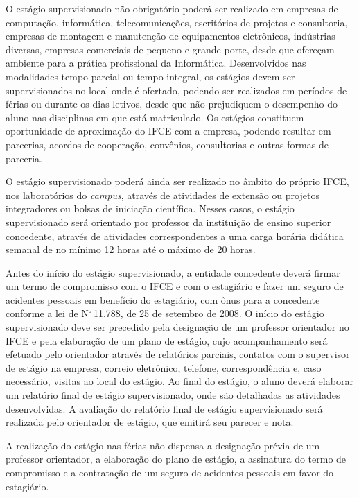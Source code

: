 \documentclass[
	12pt,				%
	openright,			%
	twoside,			%
	a4paper,			%
	chapter=TITLE,		%
	english,			%
	french,				%
	spanish,			%
	brazil,				%
	]{abntex2}
\begin{document}
O estágio supervisionado não obrigatório poderá ser realizado em empresas de computação, informática, telecomunicações, escritórios de projetos e consultoria, empresas de montagem e manutenção de equipamentos eletrônicos, indústrias diversas, empresas comerciais de pequeno e grande porte, desde que ofereçam ambiente para a prática profissional da Informática.  Desenvolvidos nas modalidades tempo parcial ou tempo integral, os estágios devem ser supervisionados no local onde é ofertado, podendo ser realizados em períodos de férias ou durante os dias letivos, desde que não prejudiquem o desempenho do aluno nas disciplinas em que está matriculado.
Os estágios constituem oportunidade de aproximação do IFCE com a empresa, podendo resultar em parcerias, acordos de cooperação, convênios, consultorias e outras formas de parceria.


O estágio supervisionado poderá ainda ser realizado no âmbito do próprio IFCE, nos laboratórios do \textit{campus}, através de atividades de extensão ou projetos integradores ou bolsas de iniciação científica. Nesses casos, o estágio supervisionado será orientado por professor da instituição de ensino superior concedente, através de atividades correspondentes a uma carga horária didática semanal de no mínimo 12 horas até o máximo de 20 horas.

Antes do início do estágio supervisionado, a entidade concedente deverá firmar um termo de compromisso com o IFCE e com o estagiário e fazer um seguro de acidentes pessoais em benefício do estagiário, com ônus para a concedente conforme a lei de N$^\circ$\,11.788, de 25 de setembro de 2008. O início do estágio supervisionado deve ser precedido pela designação de um professor orientador no IFCE e pela elaboração de um plano de estágio, cujo acompanhamento será efetuado pelo orientador através de relatórios parciais, contatos com o supervisor de estágio na empresa, correio eletrônico, telefone, correspondência e, caso necessário, visitas ao local do estágio. Ao final do estágio, o aluno deverá elaborar um relatório final de estágio supervisionado, onde são detalhadas as atividades desenvolvidas. A avaliação do relatório final de estágio supervisionado será realizada pelo orientador de estágio, que emitirá seu parecer e nota. 

A realização do estágio nas férias não dispensa a designação prévia de um
professor orientador, a elaboração do plano de estágio, a assinatura do termo de compromisso e a contratação de um seguro de acidentes pessoais em favor do estagiário.
\end{document}
